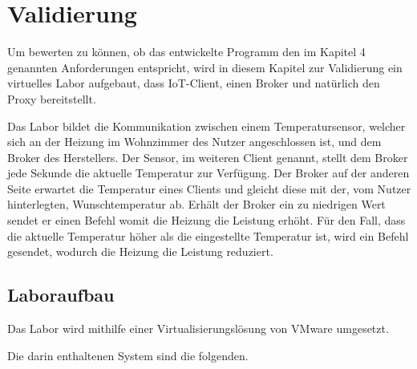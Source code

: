 \chapter{Validierung}
    
Um bewerten zu können, ob das entwickelte Programm den im Kapitel 4 genannten Anforderungen entspricht, wird in diesem Kapitel zur Validierung ein virtuelles Labor aufgebaut, dass \ac{IoT}-Client, einen Broker und natürlich den Proxy bereitstellt.

Das Labor bildet die Kommunikation zwischen einem Temperatursensor, welcher sich an der Heizung im Wohnzimmer des Nutzer angeschlossen ist, und dem Broker des Herstellers. Der Sensor, im weiteren Client genannt, stellt dem Broker jede Sekunde die aktuelle Temperatur zur Verfügung. Der Broker auf der anderen Seite erwartet die Temperatur eines Clients und gleicht diese mit der, vom Nutzer hinterlegten, Wunschtemperatur ab. Erhält der Broker ein zu niedrigen Wert sendet er einen Befehl womit die Heizung die Leistung erhöht. Für den Fall, dass die aktuelle Temperatur höher als die eingestellte Temperatur ist, wird ein Befehl gesendet, wodurch die Heizung die Leistung reduziert.

\section{Laboraufbau}
    Das Labor wird mithilfe einer Virtualisierungslösung von VMware %
    umgesetzt.  
    
    Die darin enthaltenen System sind die folgenden.
    
